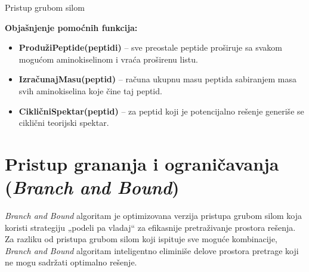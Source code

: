 \documentclass[12pt,oneside]{memoir}
\begin{document}
\begin{algorithm}[H]
\label{alg:brute_force}
\caption{Pristup grubom silom}
\SetAlgoLined
\DontPrintSemicolon
{}
\end{algorithm}

\noindent
\textbf{Objašnjenje pomoćnih funkcija:}
\begin{itemize}
  \item \textbf{ProdužiPeptide(peptidi)} – sve preostale peptide proširuje sa svakom mogućom aminokiselinom i vraća proširenu listu.
  \item \textbf{IzračunajMasu(peptid)} – računa ukupnu masu peptida sabiranjem masa svih aminokiselina koje čine taj peptid.
  \item \textbf{CikličniSpektar(peptid)} – za peptid koji je potencijalno rešenje generiše se ciklični teorijski spektar.
\end{itemize}

\section{Pristup grananja i ograničavanja (\emph{Branch and Bound})}
\emph{Branch and Bound} algoritam \cite{online_lecture, online_book} je optimizovana verzija pristupa grubom silom koja koristi strategiju „podeli pa vladaj“ za efikasnije pretraživanje prostora rešenja. Za razliku od pristupa grubom silom koji ispituje sve moguće kombinacije, \emph{Branch and Bound} algoritam inteligentno eliminiše delove prostora pretrage koji ne mogu sadržati optimalno rešenje.
\end{document}
